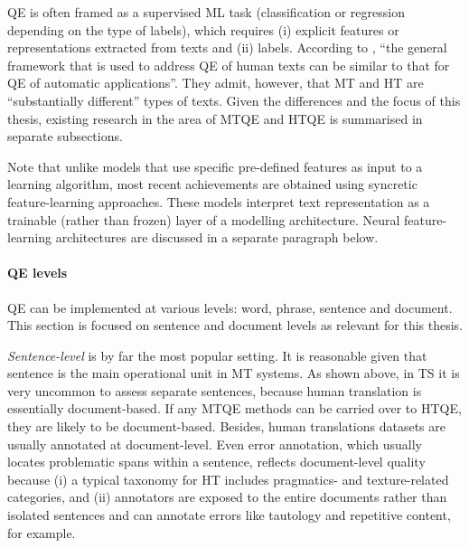 QE is often framed as a supervised ML task (classification or regression depending on the type of labels), which requires (i) explicit features or representations extracted from texts and (ii) labels. According to \citet[p.1]{Specia2018a}, ``the general framework that is used to address QE of human texts can be similar to that for QE of automatic applications''. They admit, however, that MT and HT are ``substantially different'' types of texts. Given the differences and the focus of this thesis, existing research in the area of MTQE and HTQE is summarised in separate subsections.

Note that unlike models that use specific pre-defined features as input to a learning algorithm, most recent achievements are obtained using syncretic feature-learning approaches. These models interpret text representation as a trainable (rather than frozen) layer of a modelling architecture. Neural feature-learning architectures are discussed in a separate paragraph below. 

\paragraph{QE levels} QE can be implemented at various levels: word, phrase, sentence and document. This section is focused on sentence and document levels as relevant for this thesis.

\textit{Sentence-level} is by far the most popular setting. It is reasonable given that sentence is the main operational unit in MT systems. As shown above, in TS it is very uncommon to assess separate sentences, because human translation is essentially document-based. If any MTQE methods can be carried over to HTQE, they are likely to be document-based. Besides, human translations datasets are usually annotated at document-level. Even error annotation, which usually locates problematic spans within a sentence, reflects document-level quality because (i) a typical taxonomy for HT includes pragmatics- and texture-related categories, and (ii) annotators are exposed to the entire documents rather than isolated sentences and can annotate errors like tautology and repetitive content, for example. 

